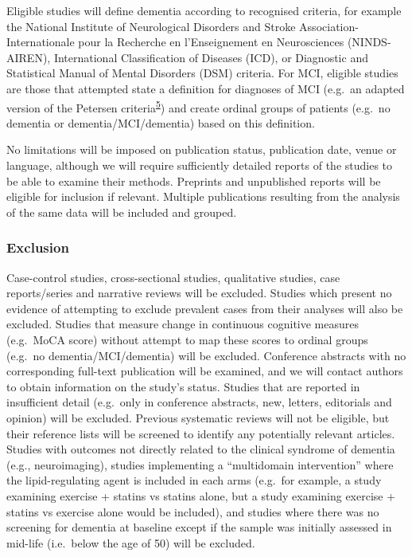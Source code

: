 \documentclass[a4paper, nobind]{templates/ociamthesis}
\begin{document}
Eligible studies will define dementia according to recognised criteria, for example the National Institute of Neurological Disorders and Stroke Association-Internationale pour la Recherche en l'Enseignement en Neurosciences (NINDS-AIREN), International Classification of Diseases (ICD), or Diagnostic and Statistical Manual of Mental Disorders (DSM) criteria. For MCI, eligible studies are those that attempted state a definition for diagnoses of MCI (e.g.~an adapted version of the Petersen criteria\textsuperscript{\protect\hyperlink{ref-petersen1999}{5}}) and create ordinal groups of patients (e.g.~no dementia or dementia/MCI/dementia) based on this definition.

No limitations will be imposed on publication status, publication date, venue or language, although we will require sufficiently detailed reports of the studies to be able to examine their methods. Preprints and unpublished reports will be eligible for inclusion if relevant. Multiple publications resulting from the analysis of the same data will be included and grouped.

\hypertarget{exclusion}{%
\subsubsection{Exclusion}\label{exclusion}}

Case-control studies, cross-sectional studies, qualitative studies, case reports/series and narrative reviews will be excluded. Studies which present no evidence of attempting to exclude prevalent cases from their analyses will also be excluded. Studies that measure change in continuous cognitive measures (e.g.~MoCA score) without attempt to map these scores to ordinal groups (e.g.~no dementia/MCI/dementia) will be excluded. Conference abstracts with no corresponding full-text publication will be examined, and we will contact authors to obtain information on the study's status. Studies that are reported in insufficient detail (e.g.~only in conference abstracts, new, letters, editorials and opinion) will be excluded. Previous systematic reviews will not be eligible, but their reference lists will be screened to identify any potentially relevant articles. Studies with outcomes not directly related to the clinical syndrome of dementia (e.g., neuroimaging), studies implementing a ``multidomain intervention'' where the lipid-regulating agent is included in each arms (e.g.~for example, a study examining exercise + statins vs statins alone, but a study examining exercise + statins vs exercise alone would be included), and studies where there was no screening for dementia at baseline except if the sample was initially assessed in mid-life (i.e.~below the age of 50) will be excluded.
\end{document}
